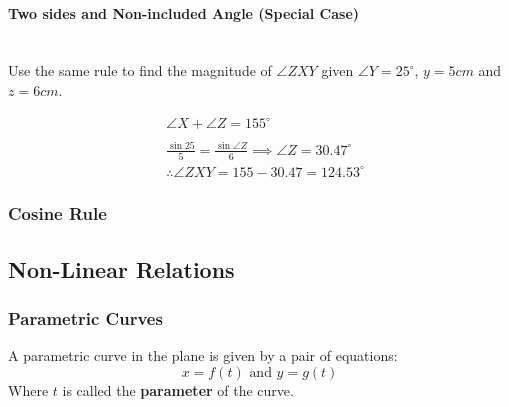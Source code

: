\documentclass[a4paper]{article}
\begin{document}
				\paragraph{Two sides and Non-included Angle (Special Case)}\mbox{}\\
					Use the same rule to find the magnitude of $\angle ZXY$ given $\angle Y=25^\circ$, $y=5cm$ and $z=6cm$.\newline
					\begin{minipage}[t]{0.4\textwidth}
						\vspace{0pt}
					\end{minipage}
					\hfill
					\begin{minipage}[t]{0.5\textwidth}
						\vspace{0pt}
						\begin{align*}
							&\angle X + \angle Z=155^\circ \\\\
							&\frac{\sin25}{5}=\frac{\sin\angle Z}{6} \implies \angle Z = 30.47^\circ \\
							&\therefore \angle ZXY = 155-30.47=124.53^\circ
						\end{align*}
					\end{minipage}
			\subsubsection{Cosine Rule}
		\subsection{Non-Linear Relations}
			\subsubsection{Parametric Curves}
				A parametric curve in the plane is given by a pair of equations:
				\[
					x=f(t) \text{ and }y=g(t)
				\]
				Where $t$ is called the \textbf{parameter} of the curve.
\end{document}
